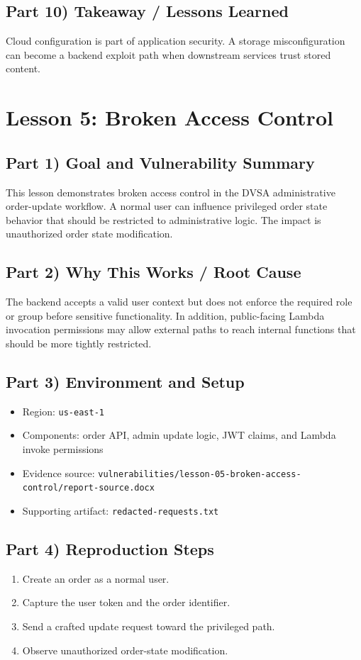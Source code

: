 \documentclass[12pt]{article}
\begin{document}
\subsection*{Part 10) Takeaway / Lessons Learned}
Cloud configuration is part of application security. A storage misconfiguration can become a backend exploit path when downstream services trust stored content.

\clearpage
\section{Lesson 5: Broken Access Control}

\subsection*{Part 1) Goal and Vulnerability Summary}
This lesson demonstrates broken access control in the DVSA administrative order-update workflow. A normal user can influence privileged order state behavior that should be restricted to administrative logic. The impact is unauthorized order state modification.

\subsection*{Part 2) Why This Works / Root Cause}
The backend accepts a valid user context but does not enforce the required role or group before sensitive functionality. In addition, public-facing Lambda invocation permissions may allow external paths to reach internal functions that should be more tightly restricted.

\subsection*{Part 3) Environment and Setup}
\begin{itemize}
\item Region: \texttt{us-east-1}
\item Components: order API, admin update logic, JWT claims, and Lambda invoke permissions
\item Evidence source: \texttt{vulnerabilities/lesson-05-broken-access-control/report-source.docx}
\item Supporting artifact: \texttt{redacted-requests.txt}
\end{itemize}

\subsection*{Part 4) Reproduction Steps}
\begin{enumerate}
\item Create an order as a normal user.
\item Capture the user token and the order identifier.
\item Send a crafted update request toward the privileged path.
\item Observe unauthorized order-state modification.
\end{enumerate}
\end{document}
